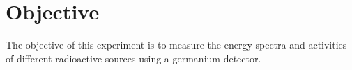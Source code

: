 \section{Objective}
\label{sec:Objective}

The objective of this experiment is to measure the energy spectra and activities of different radioactive sources using a germanium detector.